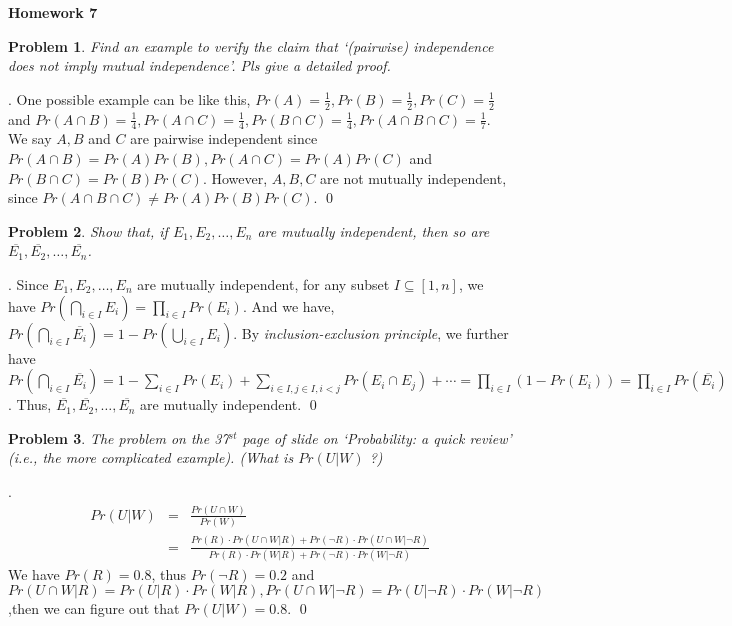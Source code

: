 \documentclass[12pt]{article}
\date{Feb 14, 2012}
\newtheorem{hw}{Problem}
\newenvironment{sol}
  {\par\vspace{3mm}\noindent{\it Solution}.}
  {\qed}
\begin{document}
\begin{center}
{\LARGE\bf Homework 7}\\
\vspace{2mm}
\end{center}

\begin{hw}
Find an example to verify the claim that `(pairwise) independence does not  imply mutual independence'.  Pls give a detailed proof.
\end{hw}
\begin{sol}
	One possible example can be like this, $Pr(A) = \frac{1}{2}, Pr(B) = \frac{1}{2}, Pr(C) = \frac{1}{2}$ and $Pr(A \cap B) = \frac{1}{4}, Pr(A \cap C) = \frac{1}{4}, Pr(B \cap C) = \frac{1}{4}, Pr(A \cap B \cap C) = \frac{1}{7}$. We say $A, B$ and $C$ are pairwise independent since $Pr(A \cap B) = Pr(A)Pr(B), Pr(A \cap C) = Pr(A)Pr(C)$ and $Pr(B \cap C) = Pr(B)Pr(C)$. However, $A, B, C$ are not mutually independent, since $Pr(A \cap B \cap C) \neq Pr(A)Pr(B)Pr(C)$.
\end{sol}



\begin{hw}
Show that, if $E_1, E_2, \ldots, E_n$ are mutually independent, then so are $\overline{E_1}, \overline{E_2},\ldots, \overline{E_n}$.
\end{hw}
\begin{sol}
	Since $E_1, E_2, \ldots, E_n$ are mutually independent, for any subset $I \subseteq [1,n]$, we have $Pr\left(\bigcap_{i \in I}E_{i}\right) = \prod_{i \in I}Pr(E_{i})$. And we have, $Pr\left( \bigcap_{i \in I}\overline{E_{i}}\right) = 1 - Pr\left( \bigcup_{i \in I}{E_{i}}\right)$. By \emph{inclusion-exclusion principle}, we further have $Pr\left( \bigcap_{i \in I}\overline{E_{i}}\right) = 1 - \sum_{i \in I}Pr(E_{i}) + \sum_{i \in I, j \in I, i < j}Pr(E_{i} \cap E_{j}) + \cdots = \prod_{i \in I}(1 - Pr(E_{i})) = \prod_{i \in I}Pr\left(\overline{E_{i}}\right)$. Thus, $\overline{E_1}, \overline{E_2},\ldots, \overline{E_n}$ are mutually independent.
\end{sol}


\begin{hw} The problem on the 37$^{st}$ page of slide on `\emph{Probability: a quick review}' (i.e., \emph{the more complicated example}). (What is $Pr(U|W)$ ?)

\end{hw}
\begin{sol}
	\begin{displaymath}
		\renewcommand\arraystretch{1.3}
		\begin{array}{lcl}
			Pr(U|W) & = & \frac{Pr(U \cap W)}{Pr(W)} \\
		        	& = & \frac{Pr(R) \cdot Pr(U \cap W|R) + Pr(\neg R) \cdot Pr(U \cap W|\neg R)}{Pr(R) \cdot Pr(W|R) + Pr(\neg R) \cdot Pr(W|\neg R)}
		\end{array}
	\end{displaymath}
	We have $Pr(R) = 0.8$, thus $Pr(\neg R) = 0.2$ and $Pr(U \cap W|R) = Pr(U|R) \cdot Pr(W|R), Pr(U \cap W|\neg R) = Pr(U|\neg R) \cdot Pr(W|\neg R)$,then we can figure out that $Pr(U|W) = 0.8$.
\end{sol}
\end{document}
